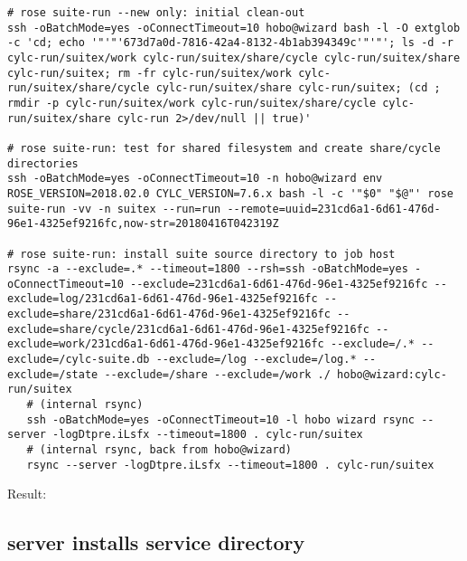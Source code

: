 \documentclass{article}
\begin{document}
\vspace{5mm}
\begin{lstlisting}
# rose suite-run --new only: initial clean-out
ssh -oBatchMode=yes -oConnectTimeout=10 hobo@wizard bash -l -O extglob -c 'cd; echo '"'"'673d7a0d-7816-42a4-8132-4b1ab394349c'"'"'; ls -d -r cylc-run/suitex/work cylc-run/suitex/share/cycle cylc-run/suitex/share cylc-run/suitex; rm -fr cylc-run/suitex/work cylc-run/suitex/share/cycle cylc-run/suitex/share cylc-run/suitex; (cd ; rmdir -p cylc-run/suitex/work cylc-run/suitex/share/cycle cylc-run/suitex/share cylc-run 2>/dev/null || true)'

# rose suite-run: test for shared filesystem and create share/cycle directories
ssh -oBatchMode=yes -oConnectTimeout=10 -n hobo@wizard env ROSE_VERSION=2018.02.0 CYLC_VERSION=7.6.x bash -l -c '"$0" "$@"' rose suite-run -vv -n suitex --run=run --remote=uuid=231cd6a1-6d61-476d-96e1-4325ef9216fc,now-str=20180416T042319Z

# rose suite-run: install suite source directory to job host
rsync -a --exclude=.* --timeout=1800 --rsh=ssh -oBatchMode=yes -oConnectTimeout=10 --exclude=231cd6a1-6d61-476d-96e1-4325ef9216fc --exclude=log/231cd6a1-6d61-476d-96e1-4325ef9216fc --exclude=share/231cd6a1-6d61-476d-96e1-4325ef9216fc --exclude=share/cycle/231cd6a1-6d61-476d-96e1-4325ef9216fc --exclude=work/231cd6a1-6d61-476d-96e1-4325ef9216fc --exclude=/.* --exclude=/cylc-suite.db --exclude=/log --exclude=/log.* --exclude=/state --exclude=/share --exclude=/work ./ hobo@wizard:cylc-run/suitex
   # (internal rsync)
   ssh -oBatchMode=yes -oConnectTimeout=10 -l hobo wizard rsync --server -logDtpre.iLsfx --timeout=1800 . cylc-run/suitex
   # (internal rsync, back from hobo@wizard)
   rsync --server -logDtpre.iLsfx --timeout=1800 . cylc-run/suitex
\end{lstlisting}

\vspace{5mm}
Result:
\lstset{language=sh}
{\scriptsize
{}
}

\subsection{server installs service directory}
\end{document}
